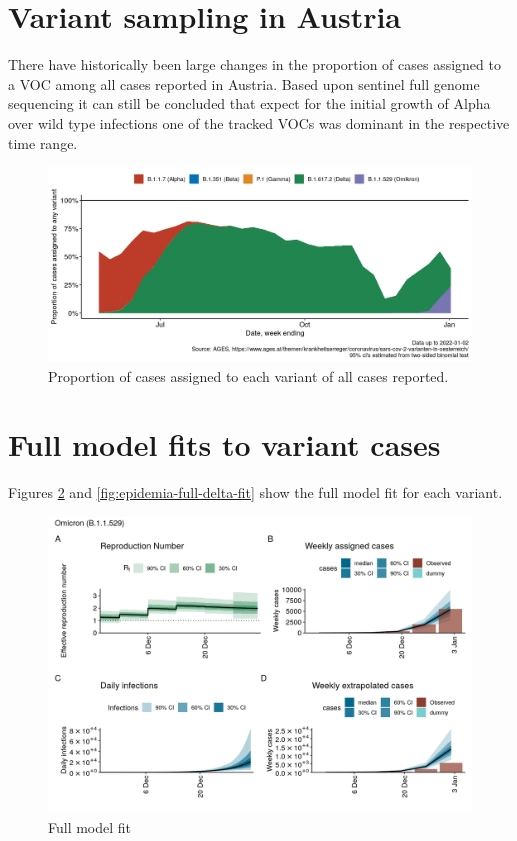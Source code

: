 \documentclass[
]{article}
\begin{document}
\hypertarget{appendix-appendix}{%
\appendix}


\hypertarget{variant-sampling-in-austria}{%
\section{Variant sampling in Austria}\label{variant-sampling-in-austria}}

There have historically been large changes in the proportion of cases assigned to a VOC among all cases reported in Austria. Based upon sentinel full genome sequencing it can still be concluded that expect for the initial growth of Alpha over wild type infections one of the tracked VOCs was dominant in the respective time range.

\begin{figure}
\includegraphics[width=1\linewidth]{omicron_austria_files/figure-latex/cases-assigned-voc-1} \caption{Proportion of cases assigned to each variant of all cases reported.}\label{fig:cases-assigned-voc}
\end{figure}

\hypertarget{full-model-fits-to-variant-cases}{%
\section{Full model fits to variant cases}\label{full-model-fits-to-variant-cases}}

Figures \ref{fig:epidemia-full-omicron-fit} and \ref{fig:epidemia-full-delta-fit} show the full model
fit for each variant.

\begin{figure}

{\centering \includegraphics[width=0.8\linewidth]{omicron_austria_files/figure-latex/epidemia-full-omicron-fit-1} 

}

\caption{Full model fit}\label{fig:epidemia-full-omicron-fit}
\end{figure}
\end{document}
